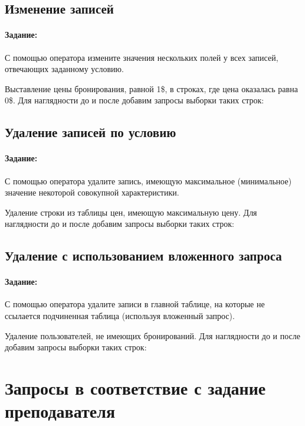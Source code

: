 

\subsection{Изменение записей}

\paragraph{Задание:} С помощью оператора  измените значения нескольких полей у всех записей, отвечающих заданному условию.

Выставление цены бронирования, равной 1\$, в строках, где цена оказалась равна 0\$. Для наглядности до и после добавим запросы выборки таких строк:

\subsection{Удаление записей по условию}

\paragraph{Задание:} С помощью оператора  удалите запись, имеющую максимальное (минимальное) значение некоторой совокупной характеристики.

Удаление строки из таблицы цен, имеющую максимальную цену. Для наглядности до и после добавим запросы выборки таких строк:

\subsection{Удаление с использованием вложенного запроса}

\paragraph{Задание:} С помощью оператора  удалите записи в главной таблице, на которые не ссылается подчиненная таблица (используя вложенный запрос).

Удаление пользователей, не имеющих бронирований.  Для наглядности до и после добавим запросы выборки таких строк:

\newpage

\section{Запросы в соответствие с задание преподавателя}


